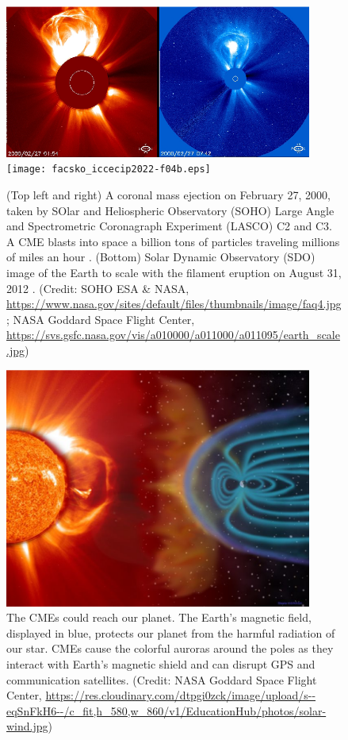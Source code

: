 \documentclass[sn-aps]{sn-jnl}%
\begin{document}
\begin{figure}[t]
\centering
\includegraphics[width=0.9\textwidth]{facsko_iccecip2022-f04a.eps}
\texttt{[image: facsko\_iccecip2022-f04b.eps]}
\caption{(Top left and right) A coronal mass ejection on February 27, 2000, taken by SOlar and Heliospheric Observatory (SOHO) Large Angle and Spectrometric Coronagraph Experiment (LASCO) C2 and C3. A CME blasts into space a billion tons of particles traveling millions of miles an hour \cite{brueckner95:_large_angle_spect_coron_lasco,domingo95:_soho}. (Bottom) Solar Dynamic Observatory (SDO) image of the Earth to scale with the filament eruption on August 31, 2012 \cite{pesnell12:_solar_dynam_obser_sdo}. (Credit: SOHO ESA \& NASA, \url{https://www.nasa.gov/sites/default/files/thumbnails/image/faq4.jpg}; NASA Goddard Space Flight Center, \url{https://svs.gsfc.nasa.gov/vis/a010000/a011000/a011095/earth\_scale.jpg})}\label{fig:cme}
\end{figure}

\begin{figure}[t]
\centering
\includegraphics[width=0.9\textwidth]{facsko_iccecip2022-f05.eps}
\caption{The CMEs could reach our planet. The Earth's magnetic field, displayed in blue, protects our planet from the harmful radiation of our star. CMEs cause the colorful auroras around the poles as they interact with Earth's magnetic shield and can disrupt GPS and communication satellites. (Credit: NASA Goddard Space Flight Center, \url{https://res.cloudinary.com/dtpgi0zck/image/upload/s--eqSnFkH6--/c_fit,h_580,w_860/v1/EducationHub/photos/solar-wind.jpg})}\label{fig:cmeearth}
\end{figure}
\end{document}
